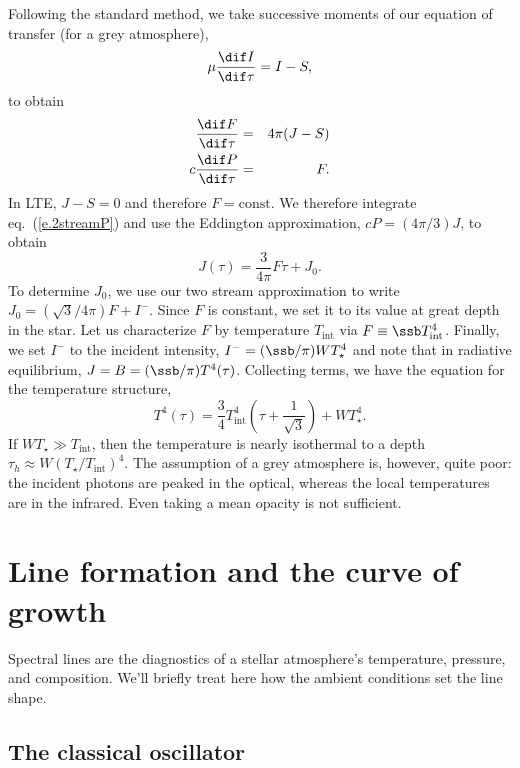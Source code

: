 Following the standard method, we take successive moments of our equation of transfer (for a grey atmosphere),
\[ \mu\frac{\dif I}{\dif \tau} = I-S, \]
to obtain
\begin{eqnarray}
\frac{\dif F}{\dif \tau} &=& 4\pi (J - S) \label{e.2streamF}\\
c\frac{\dif P}{\dif\tau} &=& F. \label{e.2streamP}
\end{eqnarray}
In LTE, $J - S = 0$ and therefore $F = \textrm{const}$.  We therefore integrate eq.~(\ref{e.2streamP}) and use the Eddington approximation, $cP = (4\pi/3)J$, to obtain
\begin{equation}\label{e.2stream-1}
J(\tau) = \frac{3}{4\pi} F \tau + J_{0}.
\end{equation}
To determine $J_{0}$, we use our two stream approximation to write $J_{0} = (\sqrt{3}/4\pi)F + I^{-}$.  Since $F$ is constant, we set it to its value at great depth in the star.  Let us characterize $F$ by temperature $T_{\mathrm{int}}$ via $F \equiv \ssb T_{\mathrm{int}}^{4}$.  Finally, we set $I^{-}$ to the incident intensity, $I^{-} = (\ssb/\pi)WT_{\star}^{4}$ and note that in radiative equilibrium, $J = B = (\ssb/\pi) T^{4}(\tau)$. Collecting terms, we have the equation for the temperature structure,
\begin{equation}\label{e.T-irradiated}
T^{4}(\tau) = \frac{3}{4} T_{\mathrm{int}}^{4}\left(\tau + \frac{1}{\sqrt{3}}\right) + W T_{\star}^{4}.
\end{equation}
If $WT_{\star} \gg T_{\mathrm{int}}$, then the temperature is nearly isothermal to a depth $\tau_{h} \approx W(T_{\star}/T_{\mathrm{int}})^{4}$.
The assumption of a grey atmosphere is, however, quite poor: the incident photons are peaked in the optical, whereas the local temperatures are in the infrared. Even taking a mean opacity is not sufficient.

\section{Line formation and the curve of growth}\label{s.curve-of-growth}

Spectral lines are the diagnostics of a stellar atmosphere's temperature, pressure, and composition.  We'll briefly treat here how the ambient conditions set the line shape.

\subsection{The classical oscillator}\label{s.classical-oscillator}

